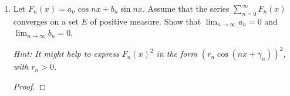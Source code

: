 \documentclass[12pt]{article}
\begin{document}
\begin{enumerate}
\begin{enumerate}[label=(\roman*)]
		      \item Let $F_n(x) = a_n \cos nx + b_n \sin nx$. Assume that the series $\sum_{n=0}^\infty F_n(x)$ converges on a set $E$ of positive measure. Show that $\lim_{n\to\infty} a_n = 0$ and $\lim_{n\to\infty} b_n = 0$.

		            \textit{Hint: It might help to express $F_n(x)^2$ in the form $(r_n \cos(nx + \gamma_n))^2$, with $r_n > 0$.}

		            \begin{proof}
		            \end{proof}
	      \end{enumerate}

\end{enumerate}
\end{document}
